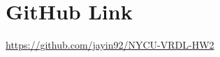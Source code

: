 \documentclass[twocolumn,a4paper]{article}
\begin{document}
%
%



\section{GitHub Link}
\noindent\url{https://github.com/jayin92/NYCU-VRDL-HW2}



\end{document}
